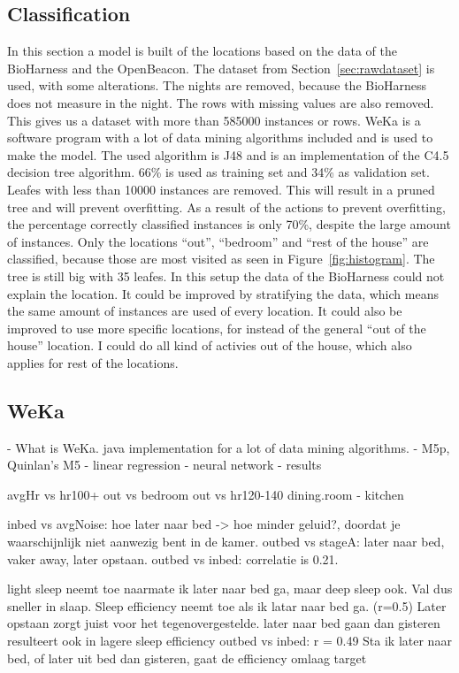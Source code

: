 	\subsection{Classification}
	In this section a model is built of the locations based on the data of the BioHarness and the OpenBeacon. The dataset from Section~\ref{sec:rawdataset}  is used, with some alterations. The nights are removed, because the BioHarness does not measure in the night. The rows with missing values are also removed. This gives us a dataset with more than 585000 instances or rows. WeKa \cite{weka} is a software program with a lot of data mining algorithms included and is used to make the model. The used algorithm is J48 and is an implementation of the C4.5 \cite{quinlan1993c4} decision tree algorithm. 66\% is used as training set and 34\% as validation set. Leafes with less than 10000 instances are removed. This will result in a pruned tree and will prevent overfitting. As a result of the actions to prevent overfitting, the percentage correctly classified instances is only 70\%, despite the large amount of instances. Only the locations ``out'', ``bedroom'' and ``rest of the house'' are classified, because those are most visited as seen in Figure~\ref{fig:histogram}. The tree is still big with 35 leafes. In this setup the data of the BioHarness could not explain the location. It could be improved by stratifying the data, which means the same amount of instances are used of every location. It could also be improved to use more specific locations, for instead of the general ``out of the house'' location. I could do all kind of activies out of the house, which also applies for rest of the locations. 

	\iffalse
	\subsection{WeKa}
	- What is WeKa. java implementation for a lot of data mining algorithms.
	- M5p, Quinlan's M5
	- linear regression
	- neural network
	- results 

	avgHr vs hr100+
	out vs bedroom
	out vs hr120-140
	dining.room - kitchen

	inbed vs avgNoise: hoe later naar bed -> hoe minder geluid?, doordat je waarschijnlijk niet aanwezig bent in de kamer.
	outbed vs stageA: later naar bed, vaker away, later opstaan.
	outbed vs inbed: correlatie is 0.21. 

	light sleep neemt toe naarmate ik later naar bed ga, maar deep sleep ook. Val dus sneller in slaap. 
	Sleep efficiency neemt toe als ik latar naar bed ga. (r=0.5) Later opstaan zorgt juist voor het tegenovergestelde.
	later naar bed gaan dan gisteren resulteert ook in lagere sleep efficiency
	outbed vs inbed: r = 0.49
	Sta ik later naar bed, of later uit bed dan gisteren, gaat de efficiency omlaag 
	target

